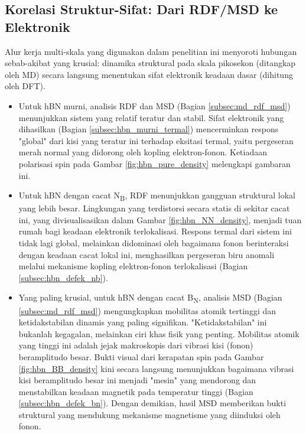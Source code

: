 \subsection{Korelasi Struktur-Sifat: Dari RDF/MSD ke Elektronik}
\label{subsec:korelasi_struktur_md_dft}
Alur kerja multi-skala yang digunakan dalam penelitian ini menyoroti hubungan sebab-akibat yang krusial: dinamika struktural pada skala pikosekon (ditangkap oleh MD) secara langsung menentukan sifat elektronik keadaan dasar (dihitung oleh DFT).
\begin{itemize}
    \item Untuk hBN murni, analisis RDF dan MSD (Bagian \ref{subsec:md_rdf_msd}) menunjukkan sistem yang relatif teratur dan stabil.
Sifat elektronik yang dihasilkan (Bagian \ref{subsec:hbn_murni_termal}) mencerminkan respons "global" dari kisi yang teratur ini terhadap eksitasi termal, yaitu pergeseran merah normal yang didorong oleh kopling elektron-fonon.
Ketiadaan polarisasi spin pada Gambar \ref{fig:hbn_pure_density} melengkapi gambaran ini.
    \item Untuk hBN dengan cacat N\textsubscript{B}, RDF menunjukkan gangguan struktural lokal yang lebih besar.
Lingkungan yang terdistorsi secara statis di sekitar cacat ini, yang divisualisasikan dalam Gambar \ref{fig:hbn_NN_density}, menjadi tuan rumah bagi keadaan elektronik terlokalisasi.
Respons termal dari sistem ini tidak lagi global, melainkan didominasi oleh bagaimana fonon berinteraksi dengan keadaan cacat lokal ini, menghasilkan pergeseran biru anomali melalui mekanisme kopling elektron-fonon terlokalisasi (Bagian \ref{subsec:hbn_defek_nb}).
\item Yang paling krusial, untuk hBN dengan cacat B\textsubscript{N}, analisis MSD (Bagian \ref{subsec:md_rdf_msd}) mengungkapkan mobilitas atomik tertinggi dan ketidakstabilan dinamis yang paling signifikan.
"Ketidakstabilan" ini bukanlah kegagalan, melainkan ciri khas fisik yang penting.
Mobilitas atomik yang tinggi ini adalah jejak makroskopis dari vibrasi kisi (fonon) beramplitudo besar.
Bukti visual dari kerapatan spin pada Gambar \ref{fig:hbn_BB_density} kini secara langsung menunjukkan bagaimana vibrasi kisi beramplitudo besar ini menjadi "mesin" yang mendorong dan menstabilkan keadaan magnetik pada temperatur tinggi (Bagian \ref{subsec:hbn_defek_bn}).
Dengan demikian, hasil MSD memberikan bukti struktural yang mendukung mekanisme magnetisme yang diinduksi oleh fonon.
\end{itemize}


